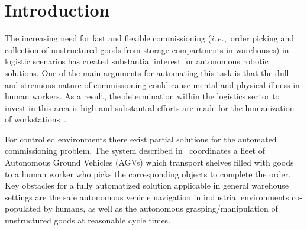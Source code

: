 \section{Introduction}
\label{sec:intro}
%
The increasing need for fast and flexible commissioning ($i.\,e.,$ order picking and collection of
unstructured goods from storage compartments in warehouses) in logistic scenarios has created
substantial interest for autonomous robotic solutions. One of the main arguments for automating this
task is that the dull and strenuous nature of commissioning could cause mental and physical illness
in human workers. As a result, the determination within the logistics sector to invest in this area
is high and substantial efforts are made for the humanization of workstations~\cite{Eche08}.

For controlled environments there exist partial solutions for the automated commissioning
problem. The system described in~\cite{Wurm08} coordinates a fleet of Autonomous Ground Vehicles
(AGVs) which transport shelves filled with goods to a human worker who picks the corresponding objects
to complete the order. Key obstacles for a fully automatized solution applicable in general
warehouse settings are the safe autonomous vehicle navigation in industrial environments
co-populated by humans, as well as the autonomous grasping/manipulation of unstructured goods at
reasonable cycle times.

